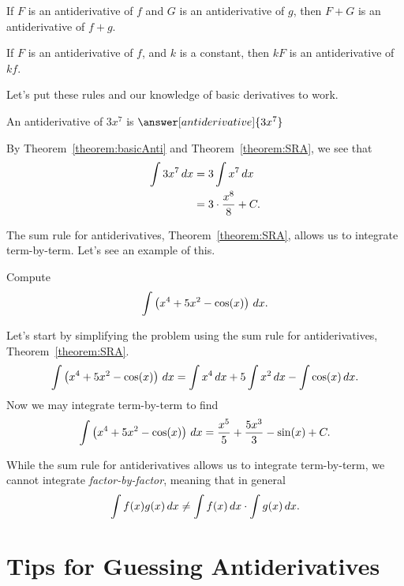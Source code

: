 \documentclass{ximera}
\begin{document}
\begin{theorem}\label{theorem:SRA}
If $F$ is an antiderivative of $f$ and $G$ is an antiderivative of $g$, then $F+G$ is an antiderivative of $f+g$.
\end{theorem}

\begin{theorem}\label{theorem:CFRA}
If $F$ is an antiderivative of $f$, and $k$ is a constant, then $kF$ is an antiderivative of $kf$.
\end{theorem}

Let's put these rules and our knowledge of basic derivatives to work.

\begin{example}
An antiderivative of $3 x^7$ is $\answer[antiderivative]{3x^7}$


By Theorem~\ref{theorem:basicAnti} and Theorem~\ref{theorem:SRA}, we
see that
\begin{align*}
\int 3 x^7 \,d x &= 3 \int x^7 \,d x\\
&= 3 \cdot \frac{x^8}{8}+C.
\end{align*}
\end{example}

The sum rule for antiderivatives, Theorem~\ref{theorem:SRA}, allows us to integrate term-by-term. Let's see an example of this.

\begin{example}
Compute
\[
\int \left(x^4 + 5x^2 - \cos(x)\right) \,d x.
\]


Let's start by simplifying the problem using the sum rule for
antiderivatives, Theorem~\ref{theorem:SRA}.
\[
\int \left(x^4 + 5x^2 - \cos(x)\right) \,d x = \int x^4 \,d x + 5\int x^2 \,d x - \int \cos(x) \,d x.
\]
Now we may integrate term-by-term to find
\[
\int \left(x^4 + 5x^2 - \cos(x)\right) \,d x = \frac{x^5}{5} + \frac{5x^3}{3}  - \sin(x)+C.
\]
\end{example}


\begin{warning}
While the sum rule for antiderivatives allows us to integrate
term-by-term, we cannot integrate \textit{factor-by-factor}, meaning
that in general
\[
\int f(x)g(x) \,d x \ne \int f(x) \,d x\cdot \int g(x) \,d x.
\]
\end{warning}








\section{Tips for Guessing Antiderivatives}
\end{document}
